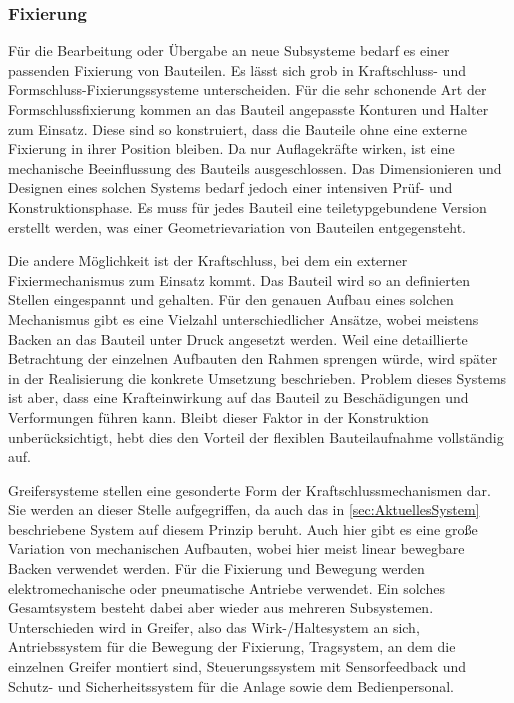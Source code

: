 \subsubsection{Fixierung}\label{sec:FixierungSystem}
Für die Bearbeitung oder Übergabe an neue Subsysteme bedarf es einer passenden Fixierung von Bauteilen. Es lässt sich grob in Kraftschluss-
und Formschluss-Fixierungssysteme unterscheiden. Für die sehr schonende Art der Formschlussfixierung kommen an das Bauteil angepasste
Konturen und Halter zum Einsatz. Diese sind so konstruiert, dass die Bauteile ohne eine externe Fixierung in ihrer Position bleiben. Da
nur Auflagekräfte wirken, ist eine mechanische Beeinflussung des Bauteils ausgeschlossen. Das Dimensionieren und Designen
eines solchen Systems bedarf jedoch einer intensiven Prüf- und Konstruktionsphase. Es muss für jedes Bauteil eine teiletypgebundene
Version erstellt werden, was einer Geometrievariation von Bauteilen entgegensteht.

Die andere Möglichkeit ist der Kraftschluss, bei dem ein externer Fixiermechanismus zum Einsatz kommt. Das Bauteil wird so an definierten
Stellen eingespannt und gehalten. Für den genauen Aufbau eines solchen Mechanismus gibt es eine Vielzahl unterschiedlicher Ansätze,
wobei meistens Backen an das Bauteil unter Druck angesetzt werden. Weil eine detaillierte Betrachtung der einzelnen Aufbauten den
Rahmen sprengen würde, wird später in der Realisierung die konkrete Umsetzung beschrieben. Problem dieses Systems ist aber, dass
eine Krafteinwirkung auf das Bauteil zu Beschädigungen und Verformungen führen kann. Bleibt dieser Faktor in der Konstruktion
unberücksichtigt, hebt dies den Vorteil der flexiblen Bauteilaufnahme vollständig auf.

Greifersysteme stellen eine gesonderte Form der Kraftschlussmechanismen dar. Sie werden an dieser Stelle aufgegriffen, da auch das
in \cref{sec:AktuellesSystem} beschriebene System auf diesem Prinzip beruht. Auch hier gibt es eine große Variation von mechanischen Aufbauten,
wobei hier meist linear bewegbare Backen verwendet werden. Für die Fixierung und Bewegung werden elektromechanische oder pneumatische
Antriebe verwendet. Ein solches Gesamtsystem besteht dabei aber wieder aus mehreren Subsystemen.
Unterschieden wird in Greifer, also das Wirk-/Haltesystem an sich, Antriebssystem für die Bewegung der Fixierung, Tragsystem,
an dem die einzelnen Greifer montiert sind, Steuerungssystem mit Sensorfeedback und Schutz- und Sicherheitssystem für die Anlage
sowie dem Bedienpersonal.

